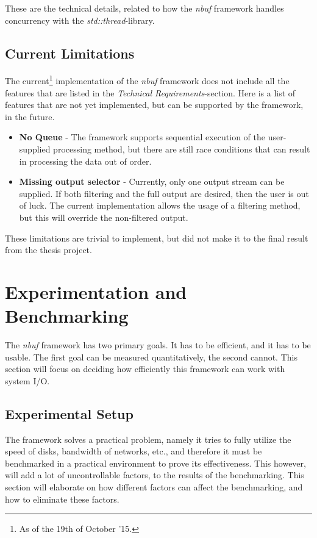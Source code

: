 \documentclass[a4paper]{article}
\newcommand{\nbuf}{\textit{nbuf} }
\begin{document}
These are the technical details, related to how the \nbuf framework handles concurrency with the \textit{std::thread}-library.


\subsection{Current Limitations}
The current\footnote{As of the 19th of October '15.} implementation of the \nbuf framework does not include all the features that are listed in the \textit{Technical Requirements}-section. Here is a list of features that are not yet implemented, but can be supported by the framework, in the future.

\begin{itemize}
\item \textbf{No Queue} - The framework supports sequential execution of the user-supplied processing method, but there are still race conditions that can result in processing the data out of order.
\item \textbf{Missing output selector} - Currently, only one output stream can be supplied. If both filtering and the full output are desired, then the user is out of luck. The current implementation allows the usage of a filtering method, but this will override the non-filtered output. 
\end{itemize}

These limitations are trivial to implement, but did not make it to the final result from the thesis project.


\newpage
\section{Experimentation and Benchmarking}
The \nbuf framework has two primary goals. It has to be efficient, and it has to be usable. The first goal can be measured quantitatively, the second cannot. This section will focus on deciding how efficiently this framework can work with system I/O. 


\subsection{Experimental Setup}
The framework solves a practical problem, namely it tries to fully utilize the speed of disks, bandwidth of networks, etc., and therefore it must be benchmarked in a practical environment to prove its effectiveness. This however, will add a lot of uncontrollable factors, to the results of the benchmarking. This section will elaborate on how different factors can affect the benchmarking, and how to eliminate these factors.\\
\end{document}
